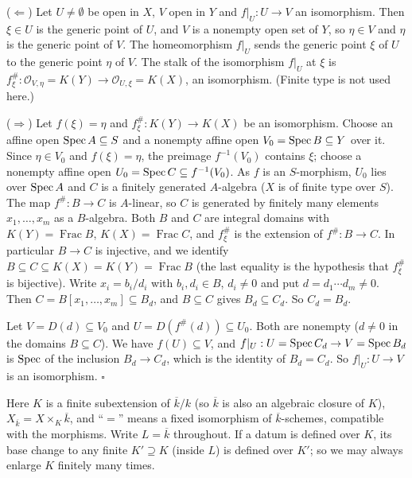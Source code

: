 \documentclass[11pt]{article}
\begin{document}
($\Leftarrow$) Let $U\ne\emptyset$ be open in $X$, $V$ open in $Y$ and $f|_U:U\to V$ an isomorphism. Then $\xi\in U$ is the generic point of $U$, and $V$ is a nonempty open set of $Y$, so $\eta\in V$ and $\eta$ is the generic point of $V$. The homeomorphism $f|_U$ sends the generic point $\xi$ of $U$ to the generic point $\eta$ of $V$. The stalk of the isomorphism $f|_U$ at $\xi$ is $f^\#_\xi:\mathcal O_{V,\eta}=K(Y)\to\mathcal O_{U,\xi}=K(X)$, an isomorphism. (Finite type is not used here.)

($\Rightarrow$) Let $f(\xi)=\eta$ and $f^\#_\xi:K(Y)\to K(X)$ be an isomorphism. Choose an affine open $\operatorname{Spec} A\subseteq S$ and a nonempty affine open $V_0=\operatorname{Spec} B\subseteq Y$ over it. Since $\eta\in V_0$ and $f(\xi)=\eta$, the preimage $f^{-1}(V_0)$ contains $\xi$; choose a nonempty affine open $U_0=\operatorname{Spec} C\subseteq f^{-1}(V_0)$. As $f$ is an $S$-morphism, $U_0$ lies over $\operatorname{Spec} A$ and $C$ is a finitely generated $A$-algebra ($X$ is of finite type over $S$). The map $f^\#:B\to C$ is $A$-linear, so $C$ is generated by finitely many elements $x_1,\dots,x_m$ as a $B$-algebra. Both $B$ and $C$ are integral domains with $K(Y)=\operatorname{Frac}B$, $K(X)=\operatorname{Frac}C$, and $f^\#_\xi$ is the extension of $f^\#:B\to C$. In particular $B\to C$ is injective, and we identify $B\subseteq C\subseteq K(X)=K(Y)=\operatorname{Frac}B$ (the last equality is the hypothesis that $f^\#_\xi$ is bijective). Write $x_i=b_i/d_i$ with $b_i,d_i\in B$, $d_i\neq0$ and put $d=d_1\cdots d_m\ne0$. Then $C=B[x_1,\dots,x_m]\subseteq B_d$, and $B\subseteq C$ gives $B_d\subseteq C_d$. So $C_d=B_d$.

Let $V=D(d)\subseteq V_0$ and $U=D(f^\#(d))\subseteq U_0$. Both are nonempty ($d\ne0$ in the domains $B\subseteq C$). We have $f(U)\subseteq V$, and $f|_U:U=\operatorname{Spec} C_d\to V=\operatorname{Spec} B_d$ is $\operatorname{Spec}$ of the inclusion $B_d\to C_d$, which is the identity of $B_d=C_d$. So $f|_U:U\to V$ is an isomorphism. \hfill$\square$

\pf
Here $K$ is a finite subextension of $\overline k/k$ (so $\overline k$ is also an algebraic closure of $K$), $X_{\overline k}=X\times_K\overline k$, and ``$=$'' means a fixed isomorphism of $\overline k$-schemes, compatible with the morphisms. Write $L=\overline k$ throughout. If a datum is defined over $K$, its base change to any finite $K'\supseteq K$ (inside $L$) is defined over $K'$; so we may always enlarge $K$ finitely many times.
\end{document}
